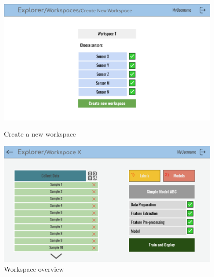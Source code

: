 \begin{figure}[h]
    \centering
    \begin{minipage}{.4\textwidth}
        \centering
        \includegraphics[width = \textwidth]{mockups/3.png}
        \caption{Create a new workspace}
        \label{fig:create-workspace}
    \end{minipage}
    \hfill
    \begin{minipage}{.4\textwidth}
        \centering
        \includegraphics[width = \textwidth]{mockups/4.png}
        \caption{Workspace overview}
        \label{fig:workspaces-overview}
    \end{minipage}
\end{figure}

